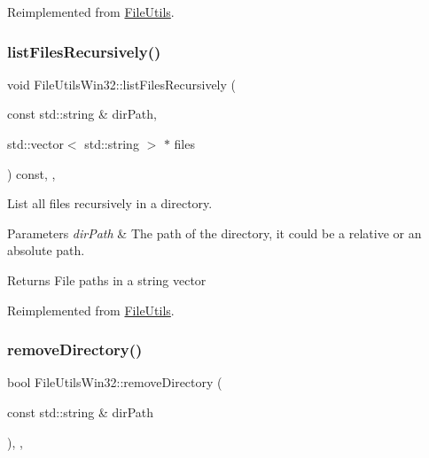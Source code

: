 Reimplemented from \hyperlink{classFileUtils_a88fc43b561884e12a9a2d41a9e3b4df4}{File\+Utils}.

\mbox{\label{classFileUtilsWin32_a40ce728356a261d1eb35f6c0c72ae9e0}} 
\subsubsection{\texorpdfstring{list\+Files\+Recursively()}{listFilesRecursively()}}
{\footnotesize\ttfamily void File\+Utils\+Win32\+::list\+Files\+Recursively (\begin{DoxyParamCaption}\item[{const std\+::string \&}]{dir\+Path,  }\item[{std\+::vector$<$ std\+::string $>$ $\ast$}]{files }\end{DoxyParamCaption}) const\hspace{0.3cm}{\ttfamily [override]}, {\ttfamily [protected]}, {\ttfamily [virtual]}}

List all files recursively in a directory.


\begin{DoxyParams}{Parameters}
{\em dir\+Path} & The path of the directory, it could be a relative or an absolute path. \\
\hline
\end{DoxyParams}
\begin{DoxyReturn}{Returns}
File paths in a string vector 
\end{DoxyReturn}


Reimplemented from \hyperlink{classFileUtils_a9507d436baf8e10b6880bb1779649a54}{File\+Utils}.

\mbox{\label{classFileUtilsWin32_a50a9cd9c6a65e4a3c33d188ac78b8a74}} 
\subsubsection{\texorpdfstring{remove\+Directory()}{removeDirectory()}\hspace{0.1cm}{\footnotesize\ttfamily [1/2]}}
{\footnotesize\ttfamily bool File\+Utils\+Win32\+::remove\+Directory (\begin{DoxyParamCaption}\item[{const std\+::string \&}]{dir\+Path }\end{DoxyParamCaption})\hspace{0.3cm}{\ttfamily [override]}, {\ttfamily [protected]}, {\ttfamily [virtual]}}

